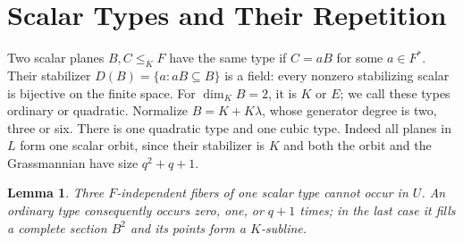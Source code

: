 \documentclass[12pt,letterpaper,onecolumn]{article}
\newtheorem{lemma}[theorem]{Lemma}
\theoremstyle{definition}
\theoremstyle{remark}
\begin{document}
\section{Scalar Types and Their Repetition}
Two scalar planes \(B,C\le_KF\) have the same type if \(C=aB\) for some \(a\in F^*\).
Their stabilizer \(D(B)=\{a:aB\subseteq B\}\) is a field: every nonzero stabilizing scalar is bijective on the finite space.
For \(\dim_KB=2\), it is \(K\) or \(E\); we call these types ordinary or quadratic.
Normalize \(B=K+K\lambda\), whose generator degree is two, three or six.
There is one quadratic type and one cubic type. Indeed all planes in \(L\) form one scalar orbit, since their stabilizer is \(K\) and both the orbit and the Grassmannian have size \(q^2+q+1\).

\begin{lemma}\label{lem:core-three-fibers}
Three \(F\)-independent fibers of one scalar type cannot occur in \(U\).
An ordinary type consequently occurs zero, one, or \(q+1\) times; in the last case it fills a complete section \(B^2\) and its points form a \(K\)-subline.
\end{lemma}
\end{document}
